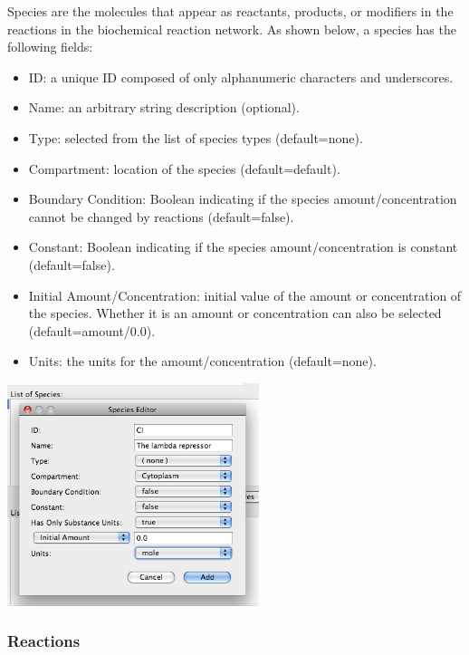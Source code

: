\documentclass[titlepage,11pt]{article}
\begin{document}
\noindent
Species are the molecules that appear as reactants, products, or modifiers
in the reactions in the biochemical reaction network. 
As shown below, a species has the following fields:
\begin{itemize}
\item ID: a unique ID composed of only alphanumeric characters and 
       underscores.
\item Name: an arbitrary string description (optional).
\item Type: selected from the list of species types (default=none).
\item Compartment: location of the species (default=default).
\item Boundary Condition: Boolean indicating if the species 
       amount/concentration
       cannot be changed by reactions (default=false).
\item Constant: Boolean indicating if the species amount/concentration 
       is constant (default=false).
\item Initial Amount/Concentration: initial value of the amount or 
       concentration of the species. Whether it is an amount or concentration
       can also be selected (default=amount/0.0).
\item Units: the units for the amount/concentration (default=none).
\end{itemize}
\begin{center}
\includegraphics[height=65mm]{screenshots/species}
\end{center}

\clearpage

\subsubsection{\label{reactions}Reactions}
\end{document}
